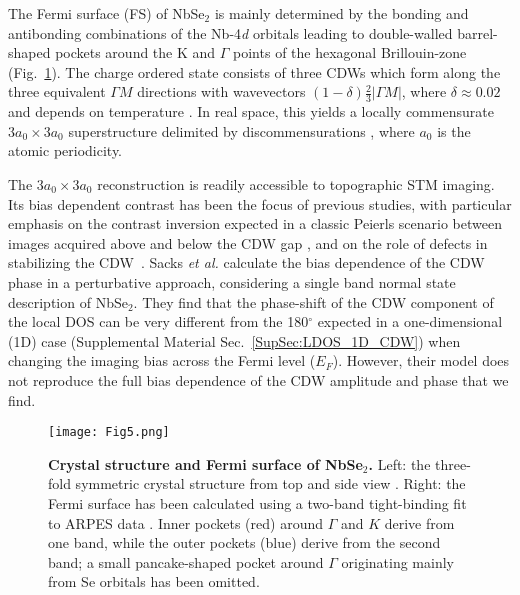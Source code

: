 \documentclass[aps,prl,twocolumn,superscriptaddress]{revtex4-2}
\def \suppsec[#1]{Supplemental Material Sec.~\ref{#1}}
\begin{document}
The Fermi surface (FS) of NbSe$_2$ is mainly determined by the bonding and antibonding combinations of the Nb-4\textit{d} orbitals \cite{Johannes2006,Flicker2015natcomm} leading to double-walled barrel-shaped pockets around the K and $\Gamma$ points of the hexagonal Brillouin-zone \cite{Corcoran1994,Rossnagel2001,Borisenko2009, Rahn2012} (Fig.~\ref{fig:struct_FS}). The charge ordered state consists of three CDWs which form along the three equivalent $\Gamma M$ directions with wavevectors $(1-\delta)\frac{2}{3}|{\Gamma M}|$, where $\delta\approx0.02$ and depends on temperature \cite{Moncton1975}. In real space, this yields a locally commensurate $3a_0\times3a_0$ superstructure delimited by discommensurations \cite{McMillan1976, Pasztor2019}, where $a_0$ is the atomic periodicity.

The $3a_0\times3a_0$ reconstruction is readily accessible to topographic STM imaging. Its bias dependent contrast has been the focus of previous studies, with particular emphasis on the contrast inversion expected in a classic Peierls scenario between images acquired above and below the CDW gap \cite{Mallet1996, Sacks1998}, and on the role of defects in stabilizing the CDW~\cite{Arguello2014}. Sacks \textit{et al.} \cite{Sacks1998} calculate the bias dependence of the CDW phase in a perturbative approach, considering a single band normal state description of NbSe$_2$. They find that the phase-shift of the CDW component of the local DOS can be very different from the 180$^\circ$ expected in a one-dimensional (1D) case (\suppsec[SupSec:LDOS_1D_CDW]) when changing the imaging bias across the Fermi level ($E_F$). However, their model does not reproduce the full bias dependence of the CDW amplitude and phase that we find.


\begin{figure}[htp]
\texttt{[image: Fig5.png]}%
\caption{\label{fig:struct_FS} \textbf{Crystal structure and Fermi surface of NbSe$_2$.} Left: the three-fold symmetric crystal structure from top and side view \cite{Momma2011}. Right: the Fermi surface has been calculated using a two-band tight-binding fit to ARPES data \cite{Rahn2012}. Inner pockets (red) around $\Gamma$ and $K$ derive from one band, while the outer pockets (blue) derive from the second band; a small pancake-shaped pocket around $\Gamma$ originating mainly from Se orbitals has been omitted.}
\end{figure}
\end{document}
